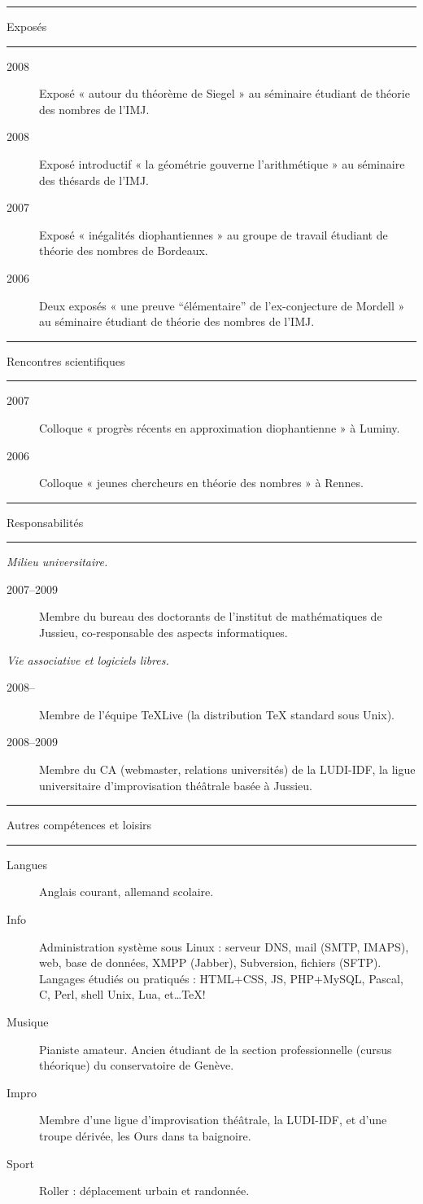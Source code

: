 \documentclass[12pt, a4paper]{article}
\newlength\dlmargin \setlength\dlmargin{6em}
\newenvironment{dateliste}{%
  \setlength\leftmargini{\dlmargin}%
  \setlength\labelsep{0pt}%
  \renewcommand\descriptionlabel[1]{%
    \makebox[\dlmargin][l]{\sffamily##1}}%
  \begin{description}
    }{%
  \end{description}}
\newcommand*\annee[1]{%
  \item[#1]}
\newcommand*\contexte[1]{%
  \par\medskip\noindent
  \textit{#1.}}
\newcommand*\partie[1]{%
  \begin{center}
  \large\sffamily\bfseries
	\hrule
    \strut#1\\
	\hrule
  \end{center}
  \nobreak}
\begin{document}
\pagebreak

\partie{Exposés}
\begin{dateliste}
  \annee{2008} Exposé « autour du théorème de Siegel » au séminaire
  étudiant de théorie des nombres de l'IMJ.
  \annee{2008} Exposé introductif « la géométrie gouverne l'arithmétique »
  au séminaire des thésards de l'IMJ.
  \annee{2007} Exposé « inégalités diophantiennes » au groupe
  de travail étudiant de théorie des nombres de Bordeaux.
  \annee{2006} Deux exposés « une preuve ``élémentaire'' de
  l'ex-conjecture de Mordell » au séminaire étudiant de théorie des
  nombres de l'IMJ.
\end{dateliste}

\partie{Rencontres scientifiques}

\begin{dateliste}
  \annee{2007} Colloque « progrès récents en approximation diophantienne »
  à Luminy.
  \annee{2006} Colloque « jeunes chercheurs en théorie des nombres » à
  Rennes.
\end{dateliste}

\partie{Responsabilités}

\contexte{Milieu universitaire}
\begin{dateliste}
  \annee{2007--2009}
  Membre du bureau des doctorants de l'institut de mathématiques de Jussieu,
  co-responsable des aspects informatiques.
\end{dateliste}

\contexte{Vie associative et logiciels libres}
\begin{dateliste}
  \annee{2008--} Membre de l'équipe \TeX\thinspace Live (la distribution \TeX{}
  standard sous Unix).
  \annee{2008--2009} Membre du CA (webmaster, relations universités) de la
  LUDI-IDF, la ligue universitaire d'improvisation théâtrale basée à Jussieu.
\end{dateliste}

\partie{Autres compétences et loisirs}
\begin{dateliste}
  \annee{Langues} Anglais courant, allemand scolaire.
  \annee{Info} Administration système sous Linux : serveur DNS, mail (SMTP,
  IMAPS), web, base de données, XMPP (Jabber), Subversion, fichiers (SFTP).\\
  Langages étudiés ou pratiqués : HTML+CSS, JS, PHP+MySQL, Pascal, C, Perl,
  shell Unix, Lua, et\dots \TeX !
  \annee{Musique} Pianiste amateur. Ancien étudiant de la section
  professionnelle (cursus théorique) du conservatoire de Genève.
  \annee{Impro} Membre d'une ligue d'improvisation théâtrale, la LUDI-IDF, et
  d'une troupe dérivée, les Ours dans ta baignoire.
  \annee{Sport} Roller : déplacement urbain et randonnée.
\end{dateliste}
\end{document}
